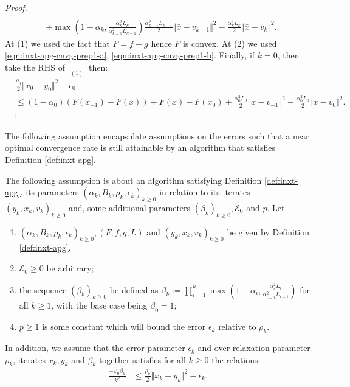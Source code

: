 \documentclass[12pt]{article}
\begin{document}
\begin{proof}
\begin{align*}
            \\ &
            + \max\left(
                    1 - \alpha_k, \frac{\alpha_k^2L_k}{\alpha_{k - 1}^2L_{k - 1}}
                \right)\frac{\alpha_{k - 1}^2L_{k - 1}}{2}\Vert \bar x - v_{k - 1}\Vert^2 
            - \frac{\alpha_k^2L_k}{2}\Vert \bar x - v_k\Vert^2. 
        \end{align*}
        At (1) we used the fact that $F = f + g$ hence $F$ is convex. 
        At (2) we used \eqref{eqn:inxt-apg-cnvg-prep1-a}, \eqref{eqn:inxt-apg-cnvg-prep1-b}. 
        Finally, if $k = 0$, then take the RHS of $\underset{(1)}{=}$ then:
        \begin{align*}
            & \frac{\rho_0}{2}\Vert x_0 - y_0\Vert^2 - \epsilon_0 
            \\
            &\le 
            (1 - \alpha_0)(F(x_{-1}) - F(\bar x)) + F(\bar x) - F(x_0) 
            + \frac{\alpha_0^2L_0}{2}\Vert \bar x - v_{-1}\Vert^2
            - \frac{\alpha_0^2L_0}{2}\Vert \bar x - v_0\Vert^2. 
        \end{align*}
    \end{proof}
    \par
    The following assumption encapsulate assumptions on the errors such that a near optimal convergence rate is still attainable by an algorithm that satisfies Definition \ref{def:inxt-apg}. 
    \begin{assumption}\label{ass:valid-err-schedule}
        The following assumption is about an algorithm satisfying Definition \ref{def:inxt-apg}, its parameters $(\alpha_k, B_k, \rho_k, \epsilon_k)_{k \ge 0}$ in relation to its iterates $(y_k, x_k, v_k)_{k\ge 0}$ and, some additional parameters $(\beta_k)_{k\ge 0}, \mathcal E_0$ and $p$. 
        Let 
        \begin{enumerate}[nosep]
            \item $(\alpha_k, B_k, \rho_k, \epsilon_k)_{k \ge 0}, (F, f, g, L)$ and $(y_k, x_k, v_k)_{k\ge 0}$ be given by Definition \ref{def:inxt-apg}. 
            \item $\mathcal E_0 \ge 0$ be arbitrary;
            \item the sequence $(\beta_k)_{k\ge 0}$ be defined as $\beta_k := \prod_{i = 1}^{k} \max\left(1 - \alpha_i, \frac{\alpha_i^2L_i}{\alpha_{i - 1}^2L_{i - 1}}\right)$ for all $k \ge 1$, with the base case being $\beta_0 = 1$; 
            \item $p \ge 1$ is some constant which will bound the error $\epsilon_k$ relative to $\rho_k$. 
        \end{enumerate}
        In addition, we assume that the error parameter $\epsilon_k$ and over-relaxation parameter $\rho_k$, iterates $x_k, y_k$ and $\beta_k$ together satisfies for all $k \ge 0$ the relations:
        \begin{align*}
            \frac{- \mathcal E_0\beta_k}{k^p} &\le 
            \frac{\rho_k}{2}\Vert x_k - y_k\Vert^2 - \epsilon_k. 
        \end{align*}
        
    \end{assumption}
\end{document}
